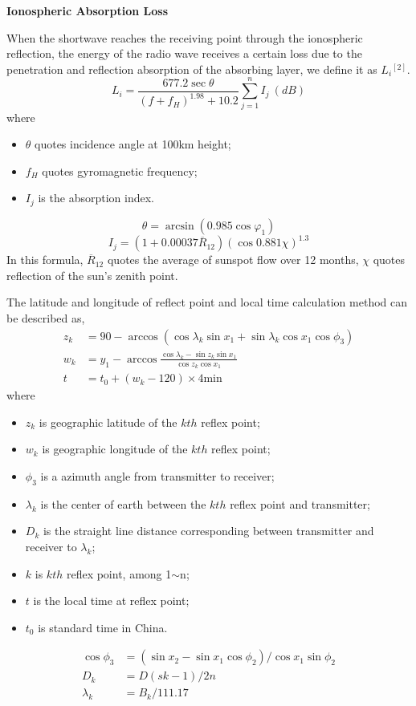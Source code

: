 \documentclass{mcmthesis}
\begin{document}
\textbf{Ionospheric Absorption Loss}

When the shortwave reaches the receiving point through the ionospheric reflection, the energy of the radio wave receives a certain loss due to the penetration and reflection absorption of the absorbing layer, we define it as $L_i$$^{[2]}$.
\begin{equation}
L_i = \frac{677.2\sec \theta}{\left( f+f_H\right)^{1.98}+10.2}
\sum\limits_{j=1}^nI_j ~(dB) 
\end{equation}
where \begin{itemize}
\item $\theta$ quotes incidence angle at 100km height;
\item $f_H$ quotes gyromagnetic frequency;
\item $I_j$ is the absorption index.
\end{itemize}
\begin{equation}
\theta = \arcsin (0.985\cos\varphi_1) 
\end{equation}
\begin{equation}
I_j = (1+0.00037\overline{R}_{12})(\cos0.881\chi)^{1.3}
\end{equation}
In this formula, $\overline{R}_{12}$ quotes the average of sunspot flow over 12 months, $\chi$ quotes reflection of the sun's zenith point. 

The  latitude and longitude of reflect point and local time calculation method can be described as,
\begin{align}
z_k &= 90-\arccos(\cos\lambda_k\sin x_1+
    \sin\lambda_k\cos x_1\cos\phi_3)\\
w_k &=y_1-\arccos \frac{ \cos\lambda_k-\sin z_k\sin x_1 }{\cos z_k\cos x_1} \\
t &= t_0 + (w_k-120)\times 4\mathrm{min}
\end{align}
where
\begin{itemize}
\item $z_k$ is geographic latitude of the $kth$ reflex point;
\item $w_k$ is geographic longitude of the $kth$ reflex point;
\item $\phi_3$ is a azimuth angle from transmitter to receiver;
\item $\lambda_k$ is the center of earth between the $kth$ reflex point and transmitter;
\item $D_k$ is the straight line distance corresponding between transmitter and receiver to $\lambda_k$;
\item $k$ is $kth$ reflex point, among 1$\sim$n;
\item $t$ is the local time at reflex point;
\item $t_0$ is standard time in China.
\end{itemize}
\begin{align}
\cos\phi_3 &= (\sin x_2-\sin x_1\cos\phi_2)/\cos x_1 \sin \phi_2 \\
D_k &= D(sk-1)/2n \\
\lambda_k &= B_k/111.17
\end{align}
\end{document}
